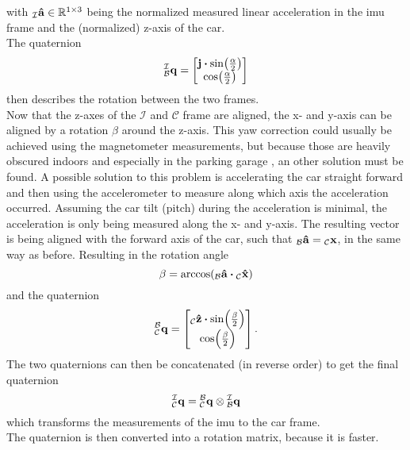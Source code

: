 with $\vincs{\vu{a}}{i} \in \mathbb{R}^{1\times3}$ being the normalized measured linear acceleration in the \gls{imu} frame and  the (normalized) z-axis of the car.\\
The quaternion
\begin{equation}
    \qtf{i}{b} =
    \begin{bmatrix}
        \vb{j}\vdot\sin(\frac{\alpha}{2}) \\
        \cos(\frac{\alpha}{2})
    \end{bmatrix}
\end{equation}
then describes the rotation between the two frames.\\
Now that the z-axes of the $\mathcal{I}$ and $\mathcal{C}$ frame are aligned, the x- and y-axis can be aligned by a rotation $\beta$ around the z-axis.
This yaw correction could usually be achieved using the magnetometer measurements, but because those are heavily obscured indoors and especially in the parking garage \cite{Li2012}, an other solution must be found.
A possible solution to this problem is accelerating the car straight forward and then using the accelerometer to measure along which axis the acceleration occurred.
Assuming the car tilt (pitch) during the acceleration is minimal, the acceleration is only being measured along the x- and y-axis.
The resulting vector is being aligned with the forward axis of the car, such that $\vincs{\hat{a}}{b} = \vincs{x}{c}$, in the same way as before.
Resulting in the rotation angle
\begin{equation}
    \beta = \arccos(\vincs{\vu{a}}{b} \vdot \vincs{\hat{x}}{c})
\end{equation}
and the quaternion
\begin{equation}
    \qtf{b}{c} =
    \begin{bmatrix}
        \vincs{\hat{z}}{c}\vdot\sin(\frac{\beta}{2}) \\
        \cos(\frac{\beta}{2})
    \end{bmatrix}.
\end{equation}
The two quaternions can then be concatenated (in reverse order) to get the final quaternion
\begin{equation}
    \qtf{i}{c} = \qtf{b}{c} \otimes  \qtf{i}{b}
\end{equation}
which transforms the measurements of the \gls{imu} to the car frame.\\
The quaternion is then converted into a rotation matrix, because it is faster.
